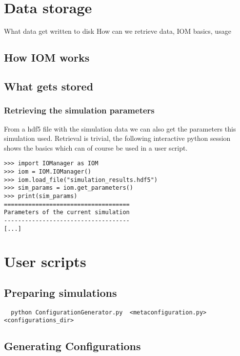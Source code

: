 \documentclass[a4paper,10pt]{report}
\begin{document}
\section{Data storage}

What data get written to disk
How can we retrieve data, IOM basics, usage


\subsection{How IOM works}

\subsection{What gets stored}

\subsubsection{Retrieving the simulation parameters}

From a hdf5 file with the simulation data we can also get the parameters this
simulation used. Retrieval is trivial, the following interactive python
session shows the basics which can of course be used in a user script.

\begin{verbatim}
>>> import IOManager as IOM
>>> iom = IOM.IOManager()
>>> iom.load_file("simulation_results.hdf5")
>>> sim_params = iom.get_parameters()
>>> print(sim_params)
====================================
Parameters of the current simulation
------------------------------------
[...]
\end{verbatim}


\section{User scripts}


\subsection{Preparing simulations}

\begin{verbatim}
  python ConfigurationGenerator.py  <metaconfiguration.py> <configurations_dir>
\end{verbatim}


\subsection{Generating Configurations}
\end{document}
